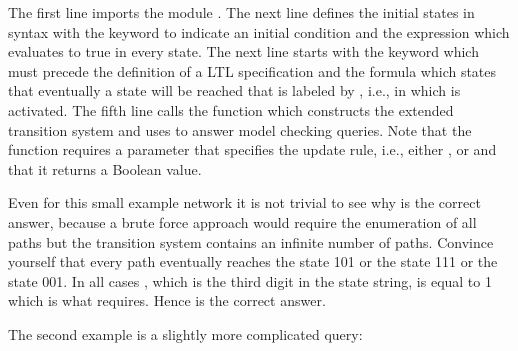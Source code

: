 \documentclass[letterpaper,10pt,english]{sphinxmanual}
\begin{document}
The first line imports the module {\hyperref[\detokenize{ModelChecking:modelchecking}]{}}.
The next line defines the initial states in {\hyperref[\detokenize{Installation:installation-nusmv}]{}} syntax with the keyword  to indicate an initial condition and
the expression  which evaluates to true in every state.
The next line starts with the keyword  which must precede the definition of a LTL specification and the formula  which
states that eventually a state will be reached that is labeled by , i.e., in which  is activated.
The fifth line calls the function {\hyperref[\detokenize{ModelChecking:check-primes}]{}} which constructs the extended transition system and
uses {\hyperref[\detokenize{Installation:installation-nusmv}]{}} to answer model checking queries.
Note that the function requires a parameter that specifies the update rule, i.e., either ,  or 
and that it returns a Boolean value.

Even for this small example network it is not trivial to see why  is the correct answer,
because a brute force approach would require the enumeration of all paths but the transition system contains an infinite number of paths.
Convince yourself that every path eventually reaches the state 101 or the state 111 or the state 001.
In all cases , which is the third digit in the state string, is equal to 1 which is what  requires.
Hence  is the correct answer.

The second example is a slightly more complicated  query:

\begin{sphinxVerbatim}[commandchars=\\\{\}]
  
     
\end{sphinxVerbatim}
\end{document}
